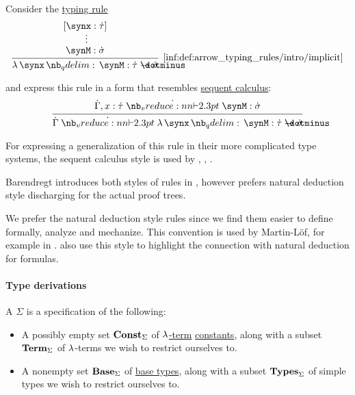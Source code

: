 \begin{remark}\label{rem:sequence_calculus_typing_rules}
  Consider the \hyperref[def:simple_typing_rule]{typing rule}
  \begin{equation*}
    \begin{prooftree}
      \hypo{ [\synx: \syn\tau] }
      \ellipsis {} { \synM: \syn\sigma }
      \infer1[\ref{inf:def:arrow_typing_rules/intro/implicit}]{ \qabs \synx \synM: \syn\tau \synimplies \syn\sigma }
    \end{prooftree}
  \end{equation*}

   and  express this rule in a form that resembles \hyperref[rem:sequent_calculus]{sequent calculus}:
  \begin{equation*}
    \begin{prooftree}
      \hypo{ \syn\Gamma, x: \syn\tau \synvdash \synM: \syn\sigma }
      \infer1{ \syn\Gamma \synvdash \qabs \synx \synM: \syn\tau \synimplies \syn\sigma }
    \end{prooftree}
  \end{equation*}

  For expressing a generalization of this rule in their more complicated type systems, the sequent calculus style is used by , , .

  Barendregt introduces both styles of rules in \cite[def. 3.1.3]{Barendregt1992LambdaCalculiWithTypes}, however prefers natural deduction style discharging for the actual proof trees.

  We prefer the natural deduction style rules since we find them easier to define formally, analyze and mechanize. This convention is used by Martin-L\"of, for example in \cite{MartinLöf1984IntuitionisticTypeTheory}.  also use this style to highlight the connection with natural deduction for formulas.
\end{remark}

\paragraph{Type derivations}

\begin{definition}\label{def:simple_type_signature}\mimprovised
  A  \( \Sigma \) is a specification of the following:
  \begin{itemize}
    \item A possibly empty set \( \op*{Const}_\Sigma \) of \hyperref[def:lambda_term]{\( \mathrm{\lambda} \)-term} \hyperref[def:lambda_term/const]{constants}, along with a subset \( \op*{Term}_\Sigma \) of \( \mathrm{\lambda} \)-terms we wish to restrict ourselves to.

    \item A nonempty set \( \op*{Base}_\Sigma \) of \hyperref[def:simple_type]{base types}, along with a subset \( \op*{Types}_\Sigma \) of simple types we wish to restrict ourselves to.
  \end{itemize}
\end{definition}

